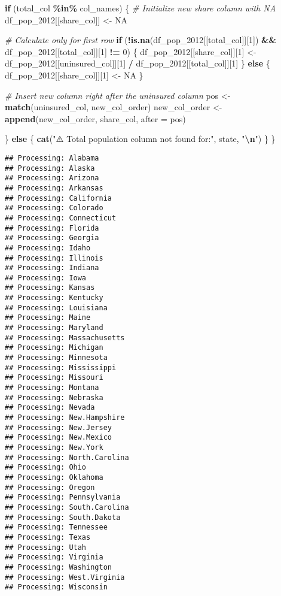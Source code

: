 \documentclass[
]{article}
\newenvironment{Shaded}{\begin{snugshade}}{\end{snugshade}}
\newcommand{\AttributeTok}[1]{\textcolor[rgb]{0.13,0.29,0.53}{#1}}
\newcommand{\CommentTok}[1]{\textcolor[rgb]{0.56,0.35,0.01}{\textit{#1}}}
\newcommand{\ConstantTok}[1]{\textcolor[rgb]{0.56,0.35,0.01}{#1}}
\newcommand{\ControlFlowTok}[1]{\textcolor[rgb]{0.13,0.29,0.53}{\textbf{#1}}}
\newcommand{\DecValTok}[1]{\textcolor[rgb]{0.00,0.00,0.81}{#1}}
\newcommand{\FunctionTok}[1]{\textcolor[rgb]{0.13,0.29,0.53}{\textbf{#1}}}
\newcommand{\NormalTok}[1]{#1}
\newcommand{\OtherTok}[1]{\textcolor[rgb]{0.56,0.35,0.01}{#1}}
\newcommand{\SpecialCharTok}[1]{\textcolor[rgb]{0.81,0.36,0.00}{\textbf{#1}}}
\newcommand{\StringTok}[1]{\textcolor[rgb]{0.31,0.60,0.02}{#1}}
\begin{document}
\begin{Shaded}
\begin{Highlighting}[]
  \ControlFlowTok{if}\NormalTok{ (total\_col }\SpecialCharTok{\%in\%}\NormalTok{ col\_names) \{}
    \CommentTok{\# Initialize new share column with NA}
\NormalTok{    df\_pop\_2012[[share\_col]] }\OtherTok{\textless{}{-}} \ConstantTok{NA}
    
    \CommentTok{\# Calculate only for first row}
    \ControlFlowTok{if}\NormalTok{ (}\SpecialCharTok{!}\FunctionTok{is.na}\NormalTok{(df\_pop\_2012[[total\_col]][}\DecValTok{1}\NormalTok{]) }\SpecialCharTok{\&\&}\NormalTok{ df\_pop\_2012[[total\_col]][}\DecValTok{1}\NormalTok{] }\SpecialCharTok{!=} \DecValTok{0}\NormalTok{) \{}
\NormalTok{      df\_pop\_2012[[share\_col]][}\DecValTok{1}\NormalTok{] }\OtherTok{\textless{}{-}}\NormalTok{ df\_pop\_2012[[uninsured\_col]][}\DecValTok{1}\NormalTok{] }\SpecialCharTok{/}\NormalTok{ df\_pop\_2012[[total\_col]][}\DecValTok{1}\NormalTok{]}
\NormalTok{    \} }\ControlFlowTok{else}\NormalTok{ \{}
\NormalTok{      df\_pop\_2012[[share\_col]][}\DecValTok{1}\NormalTok{] }\OtherTok{\textless{}{-}} \ConstantTok{NA}
\NormalTok{    \}}
    
    \CommentTok{\# Insert new column right after the uninsured column}
\NormalTok{    pos }\OtherTok{\textless{}{-}} \FunctionTok{match}\NormalTok{(uninsured\_col, new\_col\_order)}
\NormalTok{    new\_col\_order }\OtherTok{\textless{}{-}} \FunctionTok{append}\NormalTok{(new\_col\_order, share\_col, }\AttributeTok{after =}\NormalTok{ pos)}
    
\NormalTok{  \} }\ControlFlowTok{else}\NormalTok{ \{}
    \FunctionTok{cat}\NormalTok{(}\StringTok{"⚠️ Total population column not found for:"}\NormalTok{, state, }\StringTok{"}\SpecialCharTok{\textbackslash{}n}\StringTok{"}\NormalTok{)}
\NormalTok{  \}}
\NormalTok{\}}
\end{Highlighting}
\end{Shaded}

\begin{verbatim}
## Processing: Alabama 
## Processing: Alaska 
## Processing: Arizona 
## Processing: Arkansas 
## Processing: California 
## Processing: Colorado 
## Processing: Connecticut 
## Processing: Florida 
## Processing: Georgia 
## Processing: Idaho 
## Processing: Illinois 
## Processing: Indiana 
## Processing: Iowa 
## Processing: Kansas 
## Processing: Kentucky 
## Processing: Louisiana 
## Processing: Maine 
## Processing: Maryland 
## Processing: Massachusetts 
## Processing: Michigan 
## Processing: Minnesota 
## Processing: Mississippi 
## Processing: Missouri 
## Processing: Montana 
## Processing: Nebraska 
## Processing: Nevada 
## Processing: New.Hampshire 
## Processing: New.Jersey 
## Processing: New.Mexico 
## Processing: New.York 
## Processing: North.Carolina 
## Processing: Ohio 
## Processing: Oklahoma 
## Processing: Oregon 
## Processing: Pennsylvania 
## Processing: South.Carolina 
## Processing: South.Dakota 
## Processing: Tennessee 
## Processing: Texas 
## Processing: Utah 
## Processing: Virginia 
## Processing: Washington 
## Processing: West.Virginia 
## Processing: Wisconsin
\end{verbatim}
\end{document}
